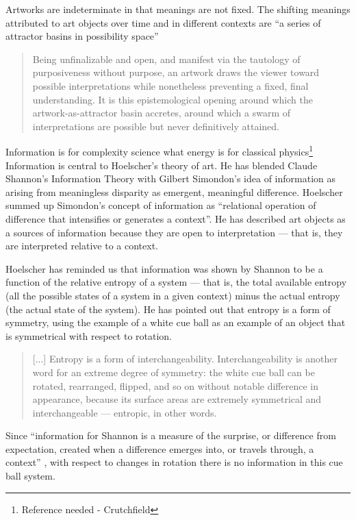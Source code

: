 \documentclass[letterpaper]{article}
\begin{document}
    Artworks are indeterminate in that meanings are not fixed. The shifting meanings attributed to art objects over time and in different contexts are “a series of attractor basins in possibility space” \citep[p.4]{HoelscherThPtcsOfPhsSpc2014}
    
    \begin{quote}
        Being unfinalizable and open, and manifest via the tautology of purposiveness without purpose, an artwork draws the viewer toward possible interpretations while nonetheless preventing a fixed, final understanding. It is this epistemological opening around which the artwork-as-attractor basin accretes, around which a swarm of interpretations are possible but never definitively attained. \citep[p.12]{HoelscherThPtcsOfPhsSpc2014}
    \end{quote}

    Information is for complexity science what energy is for classical physics\footnote{Reference needed - Crutchfield} Information is central to Hoelscher's theory of art. He has blended Claude Shannon's Information Theory with Gilbert Simondon's idea of information as arising from meaningless disparity as emergent, meaningful difference. Hoelscher summed up Simondon's concept of information as “relational operation of difference that intensifies or generates a context”. He has described art objects as a sources of information because they are open to interpretation — that is, they are interpreted relative to a context. 
    
    Hoelscher has reminded us that information was shown by Shannon to be a function of the relative entropy of a system — that is, the total available entropy (all the possible states of a system in a given context) minus the actual entropy (the actual state of the system). He has pointed out that entropy is a form of symmetry, using the example of a white cue ball as an example of an object that is symmetrical with respect to rotation.
    
    \begin{quote}
        [...] Entropy is a form of interchangeability. Interchangeability is another word for an extreme degree of symmetry: the white cue ball can be rotated, rearranged, flipped, and so on without notable difference in appearance, because its surface areas are extremely symmetrical and interchangeable — entropic, in other words.
    \end{quote}

    Since “information for Shannon is a measure of the surprise, or difference from expectation, created when a difference emerges into, or travels through, a context” \citep[p.6]{HoelscherArtAsInfrmtn2021}, with respect to changes in rotation there is no information in this cue ball system. 
    
\end{document}
